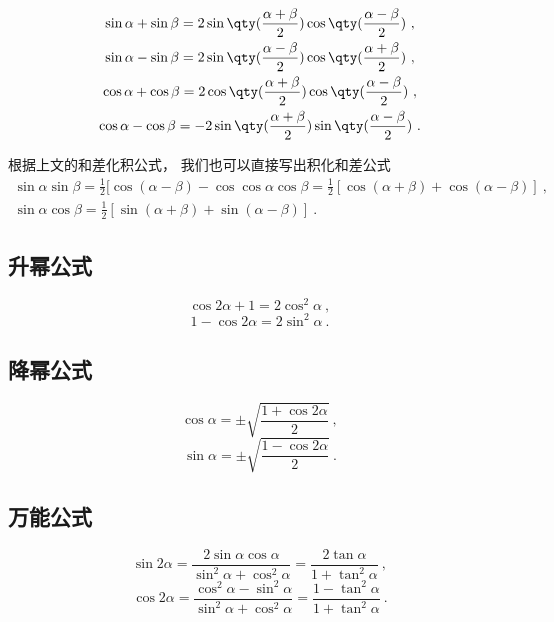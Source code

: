\begin{gather}
\sin \alpha + \sin \beta = 2\sin\qty(\frac{\alpha + \beta}{2})\cos\qty(\frac{\alpha - \beta}{2})~,\\
\sin \alpha - \sin \beta = 2\sin\qty(\frac{\alpha - \beta}{2})\cos\qty(\frac{\alpha + \beta}{2})~,\\
\cos \alpha + \cos \beta = 2\cos\qty(\frac{\alpha+\beta}{2})\cos\qty(\frac{\alpha-\beta}{2})~,\\
\cos \alpha - \cos \beta = -2\sin\qty(\frac{\alpha+\beta}{2})\sin\qty(\frac{\alpha-\beta}{2})~.
\end{gather}

根据上文的和差化积公式， 我们也可以直接写出积化和差公式
\begin{gather}
\sin \alpha\sin \beta = \frac12 [\cos(\alpha - \beta) - \cos
\cos \alpha\cos \beta = \frac12 [\cos(\alpha + \beta) + \cos(\alpha - \beta)]~,\\
\sin \alpha\cos \beta = \frac12 [\sin(\alpha + \beta) + \sin(\alpha - \beta)]~.
\end{gather}


\subsection{升幂公式}
\begin{equation}
\cos2\alpha + 1 = 2\cos^2\alpha~,
\end{equation}
\begin{equation}
1-\cos2\alpha = 2\sin^2\alpha~.
\end{equation}

\subsection{降幂公式}
\begin{equation}
\cos\alpha = \pm\sqrt{\frac{1+\cos2\alpha}{2}}~,
\end{equation}
\begin{equation}
\sin\alpha = \pm\sqrt{\frac{1-\cos2\alpha}{2}}~.
\end{equation}

\subsection{万能公式}
\begin{equation}
\sin2\alpha = \frac{2\sin\alpha \cos\alpha}{\sin^2\alpha + \cos^2\alpha} = \frac{2\tan\alpha}{1+\tan^2\alpha}~,
\end{equation}
\begin{equation}
\cos2\alpha = \frac{\cos^2\alpha-\sin^2\alpha}{\sin^2\alpha+\cos^2\alpha} = \frac{1-\tan^2\alpha}{1+\tan^2\alpha}~.
\end{equation}

